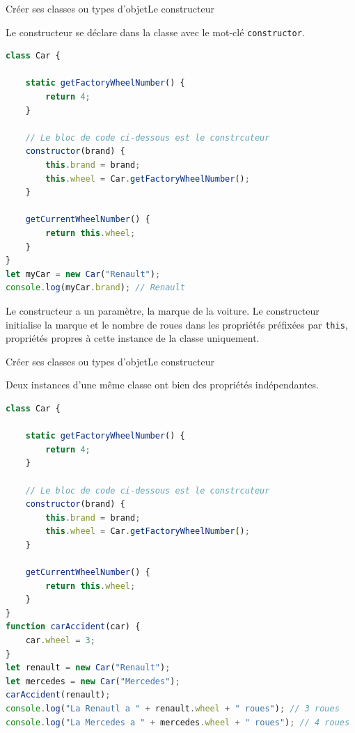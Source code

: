 \documentclass{beamer}
\begin{document}
    \begin{frame}[fragile]{Créer ses classes ou types d'objet}{Le constructeur}
        \begin{footnotesize}
            Le constructeur se déclare dans la classe avec le mot-clé \lstinline{constructor}.
            \begin{lstlisting}[language=JavaScript,title={\tiny{Script JavaScript}},basicstyle=\tiny\ttfamily]
class Car {

    static getFactoryWheelNumber() {
        return 4;
    }

    // Le bloc de code ci-dessous est le constrcuteur
    constructor(brand) {
        this.brand = brand;
        this.wheel = Car.getFactoryWheelNumber();
    }

    getCurrentWheelNumber() {
        return this.wheel;
    }
}
let myCar = new Car("Renault");
console.log(myCar.brand); // Renault
            \end{lstlisting}
            Le constructeur a un paramètre, la marque de la voiture.
            Le constructeur initialise la marque et le nombre de roues dans les propriétés préfixées par \lstinline{this}, propriétés propres à cette instance de la classe uniquement.
        \end{footnotesize}
    \end{frame}

    \begin{frame}[fragile]{Créer ses classes ou types d'objet}{Le constructeur}
        \begin{footnotesize}
            Deux instances d'une même classe ont bien des propriétés indépendantes.
            \begin{lstlisting}[language=JavaScript,title={\tiny{Script JavaScript}},basicstyle=\tiny\ttfamily]
class Car {

    static getFactoryWheelNumber() {
        return 4;
    }

    // Le bloc de code ci-dessous est le constrcuteur
    constructor(brand) {
        this.brand = brand;
        this.wheel = Car.getFactoryWheelNumber();
    }

    getCurrentWheelNumber() {
        return this.wheel;
    }
}
function carAccident(car) {
    car.wheel = 3;
}
let renault = new Car("Renault");
let mercedes = new Car("Mercedes");
carAccident(renault);
console.log("La Renautl a " + renault.wheel + " roues"); // 3 roues
console.log("La Mercedes a " + mercedes.wheel + " roues"); // 4 roues
            \end{lstlisting}
        \end{footnotesize}
    \end{frame}
\end{document}
